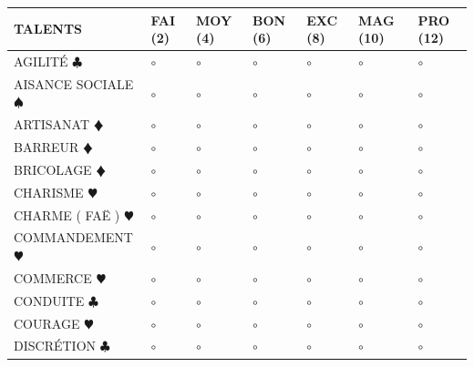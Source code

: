 \documentclass[a5paper]{letter}
\begin{document}
{{{{%

\begin{tabular}[c]{|p{}|p{}|p{}|p{}|p{}|p{}|p{}|}
	\hline
	\textbf{TALENTS}									&	FAI (2)	&	MOY (4)	&	BON (6)	&	EXC (8)	&	MAG (10)	&	PRO (12)	\\ \hline
	AGILITÉ { $\clubsuit$ }								&	$\circ$	&	$\circ$	&	$\circ$	&	$\circ$	&	$\circ$		&	$\circ$		\\ \hline
	AISANCE SOCIALE { $\spadesuit$ }					&	$\circ$	&	$\circ$	&	$\circ$	&	$\circ$	&	$\circ$		&	$\circ$		\\ \hline
	ARTISANAT {\color{red} $\vardiamond$ }				&	$\circ$	&	$\circ$	&	$\circ$	&	$\circ$	&	$\circ$		&	$\circ$		\\ \hline	
	BARREUR {\color{red} $\vardiamond$ }				&	$\circ$	&	$\circ$	&	$\circ$	&	$\circ$	&	$\circ$		&	$\circ$		\\ \hline
	BRICOLAGE {\color{red} $\vardiamond$ }				&	$\circ$	&	$\circ$	&	$\circ$	&	$\circ$	&	$\circ$		&	$\circ$		\\ \hline
	CHARISME {\color{red} $\varheart$ }					&	$\circ$	&	$\circ$	&	$\circ$	&	$\circ$	&	$\circ$		&	$\circ$		\\ \hline
	CHARME ( FAË ) {\color{red} $\varheart$ }			&	$\circ$	&	$\circ$	&	$\circ$	&	$\circ$	&	$\circ$		&	$\circ$		\\ \hline
	COMMANDEMENT {\color{red} $\varheart$ }				&	$\circ$	&	$\circ$	&	$\circ$	&	$\circ$	&	$\circ$		&	$\circ$		\\ \hline
	COMMERCE {\color{red} $\varheart$ }					&	$\circ$	&	$\circ$	&	$\circ$	&	$\circ$	&	$\circ$		&	$\circ$		\\ \hline
	CONDUITE { $\clubsuit$ }							&	$\circ$	&	$\circ$	&	$\circ$	&	$\circ$	&	$\circ$		&	$\circ$		\\ \hline
	COURAGE {\color{red} $\varheart$ }					&	$\circ$	&	$\circ$	&	$\circ$	&	$\circ$	&	$\circ$		&	$\circ$		\\ \hline
	DISCRÉTION { $\clubsuit$ }							&	$\circ$	&	$\circ$	&	$\circ$	&	$\circ$	&	$\circ$		&	$\circ$		\\ \hline

\end{tabular}}}}}
\end{document}
